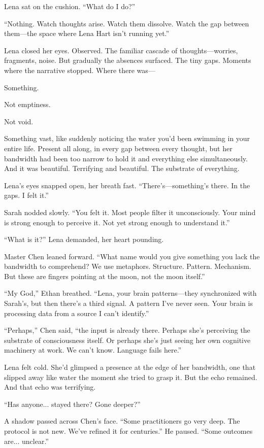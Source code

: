 Lena sat on the cushion. ``What do I do?''

``Nothing. Watch thoughts arise. Watch them dissolve. Watch the gap between them—the space where Lena Hart isn't running yet.''

Lena closed her eyes. Observed. The familiar cascade of thoughts—worries, fragments, noise. But gradually the absences surfaced. The tiny gaps. Moments where the narrative stopped. Where there was—

Something.

Not emptiness.

Not void.

Something vast, like suddenly noticing the water you'd been swimming in your entire life. Present all along, in every gap between every thought, but her bandwidth had been too narrow to hold it and everything else simultaneously. And it was beautiful. Terrifying and beautiful. The substrate of everything.

Lena's eyes snapped open, her breath fast. ``There's—something's there. In the gaps. I felt it.''

Sarah nodded slowly. ``You felt it. Most people filter it unconsciously. Your mind is strong enough to perceive it. Not yet strong enough to understand it.''

``What is it?'' Lena demanded, her heart pounding.

Master Chen leaned forward. ``What name would you give something you lack the bandwidth to comprehend? We use metaphors. Structure. Pattern. Mechanism. But these are fingers pointing at the moon, not the moon itself.''

``My God,'' Ethan breathed. ``Lena, your brain patterns—they synchronized with Sarah's, but then there's a third signal. A pattern I've never seen. Your brain is processing data from a source I can't identify.''

``Perhaps,'' Chen said, ``the input is already there. Perhaps she's perceiving the substrate of consciousness itself. Or perhaps she's just seeing her own cognitive machinery at work. We can't know. Language fails here.''

Lena felt cold. She'd glimpsed a presence at the edge of her bandwidth, one that slipped away like water the moment she tried to grasp it. But the echo remained. And that echo was terrifying.

``Has anyone... stayed there? Gone deeper?''

A shadow passed across Chen's face. ``Some practitioners go very deep. The protocol is not new. We've refined it for centuries.'' He paused. ``Some outcomes are... unclear.''

